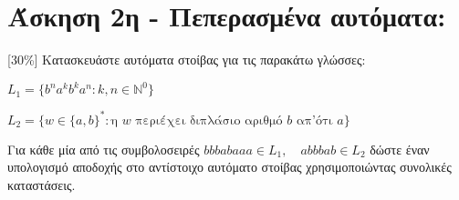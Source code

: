 \section{Άσκηση 2η - Πεπερασμένα αυτόματα:}
\label{sec:Exercise_2}
\doublespacing

[30\%] Κατασκευάστε αυτόματα στοίβας για τις παρακάτω γλώσσες:

\bm{\textcolor{blue}{(α)}} $L_1 = \{b^n a^k b^k a^n : k, n \in  \mathbb{N}^0 \}$

\bm{\textcolor{blue}{(β)}} $L_2 = \{w \in \{a, b\}^* :  \text{η } w \text{ περιέχει διπλάσιο αριθμό } b
\text{ απ'ότι } a\}$

Για κάθε μία από τις συμβολοσειρές $bbbabaaa \in L_1,\quad abbbab \in L_2$ δώστε έναν υπολογισμό αποδοχής στο
αντίστοιχο αυτόματο στοίβας χρησιμοποιώντας συνολικές καταστάσεις.
\clearpage